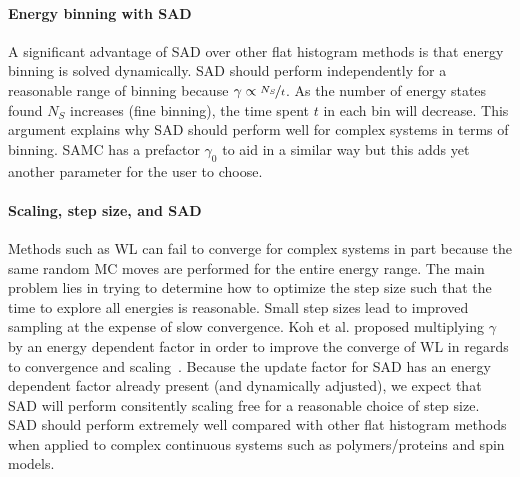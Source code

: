 \documentclass[letterpaper,twocolumn,amsmath,amssymb,pre,aps,10pt]{revtex4-1}
\begin{document}
\paragraph{Energy binning with SAD}

A significant advantage of SAD over other flat histogram methods is
that energy binning is solved dynamically. SAD should perform
independently for a reasonable range of binning because $\gamma \propto
\nicefrac{N_S}{t}$.  As the number of energy states found $N_S$
increases (fine binning), the time spent $t$ in each bin will decrease.
This argument explains why SAD should perform well for complex systems
in terms of binning. SAMC has a prefactor $\gamma_0$ to aid in a
similar way but this adds yet another parameter for the user to choose.

\paragraph{Scaling, step size, and SAD}
Methods such as WL can fail to converge for complex systems in part
because the same random MC moves are performed for the entire energy
range.  The main problem lies in trying to determine how to optimize
the step size such that the time to explore all energies is reasonable.
Small step sizes lead to improved sampling at the expense of slow
convergence. Koh et al. proposed multiplying $\gamma$ by an energy
dependent factor in order to improve the converge of WL in regards to
convergence and scaling~\cite{koh2013dynamically}.  Because the update
factor for SAD has an energy dependent factor already present (and
dynamically adjusted), we expect that SAD will perform consitently
scaling free for a reasonable choice of step size.  SAD should perform
extremely well compared with other flat histogram methods when applied
to complex continuous systems such as polymers/proteins and spin models.
\end{document}
